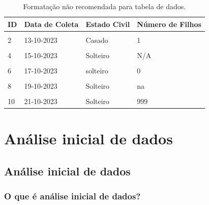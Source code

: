 \documentclass[
]{book}
\begin{document}
\begin{table}

\caption{\label{tab:tabela-evite}Formatação não recomendada para tabela de dados.}
\centering
\begin{tabu} to 
\toprule
\textbf{ID} & \textbf{Data de Coleta} & \textbf{Estado Civil} & \textbf{Número de Filhos}\\
\midrule
{} &  &  & \\
2 & 13-10-2023 & Casado & 1\\
 &  &  & \\
4 & 15-10-2023 & Solteiro & N/A\\
 &  &  & \\
6 & 17-10-2023 & solteiro & 0\\
 &  &  & \\
8 & 19-10-2023 & Solteiro & na\\
 &  &  & \\
10 & 21-10-2023 & Solteiro & 999\\
\bottomrule
\end{tabu}
\end{table}

\hypertarget{analise-inicial-dados}{%
\chapter{\texorpdfstring{\textbf{Análise inicial de dados}}{Análise inicial de dados}}\label{analise-inicial-dados}}

\hypertarget{analise-inicial}{%
\section{Análise inicial de dados}\label{analise-inicial}}

\hypertarget{o-que-uxe9-anuxe1lise-inicial-de-dados}{%
\subsection{O que é análise inicial de dados?}\label{o-que-uxe9-anuxe1lise-inicial-de-dados}}
\end{document}
